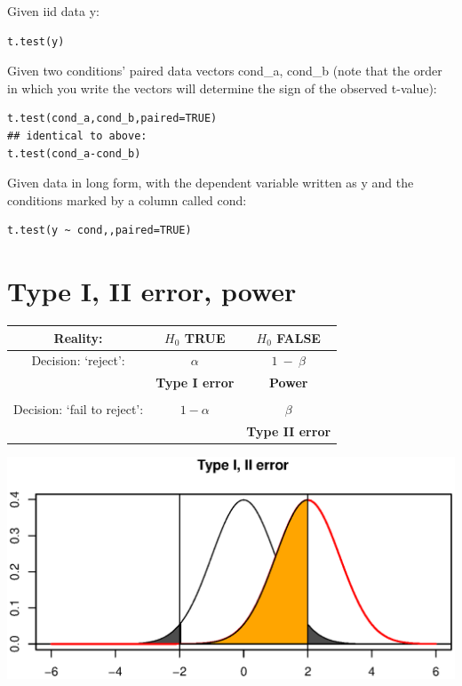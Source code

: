 \documentclass[12pt]{article}
\begin{document}
Given iid data y:

\begin{verbatim}
t.test(y)
\end{verbatim}

Given two conditions' paired data vectors cond\_a, cond\_b (note that the order in which you write the vectors will determine the sign of the observed t-value):

\begin{verbatim}
t.test(cond_a,cond_b,paired=TRUE)
## identical to above:
t.test(cond_a-cond_b)
\end{verbatim}

Given data in long form, with the dependent variable written as y and the conditions marked by a column called cond:

\begin{verbatim}
t.test(y ~ cond,,paired=TRUE)
\end{verbatim}


\section{Type I, II error, power}

\begin{tabular}{ccc}
\hline
Reality: & $H_0$ TRUE & $H_0$ FALSE \\
\hline
Decision: `reject': & $\alpha$ & $1~-~\beta$ \\
                                     & \textbf{Type I error}                         & \textbf{Power} \\                                      
                                     & & \\
\hline
Decision: `fail to reject': & $1 - \alpha$ & $\beta$ \\                                    &                                 & \textbf{Type II error}\\
\hline
\end{tabular}

{\centering \includegraphics{figures/figure-unnamed-chunk-1-1} 
}
\end{document}
